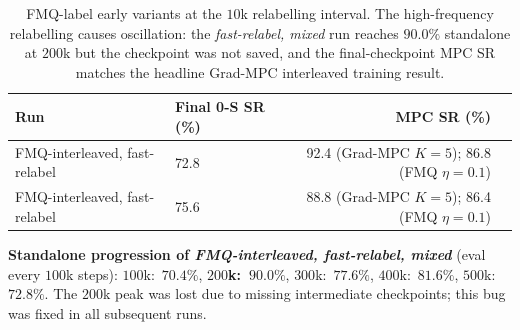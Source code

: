 \begin{table}[h]
\centering
\caption{FMQ-label early variants at the $10$k relabelling interval.
   The high-frequency relabelling causes oscillation: the
   \emph{fast-relabel, mixed} run reaches $90.0\%$ standalone at $200$k
   but the checkpoint was not saved, and the final-checkpoint MPC SR
   matches the headline Grad-MPC interleaved training result.}
\label{tab:app-fmq-early}
\begin{tabular}{l l r l}
\toprule
Run & Final 0-S SR (\%) & MPC SR (\%) \\
\midrule
FMQ-interleaved, fast-relabel  & 72.8 & 92.4 (Grad-MPC $K{=}5$); 86.8 (FMQ $\eta{=}0.1$) \\
FMQ-interleaved, fast-relabel  & 75.6 & 88.8 (Grad-MPC $K{=}5$); 86.4 (FMQ $\eta{=}0.1$) \\
\bottomrule
\end{tabular}

\medskip
\noindent\textbf{Standalone progression of \emph{FMQ-interleaved, fast-relabel, mixed}} (eval every $100$k steps):
$100$k:~$70.4\%$, \textbf{$200$k:~$90.0\%$}, $300$k:~$77.6\%$,
$400$k:~$81.6\%$, $500$k:~$72.8\%$. The $200$k peak was lost due to
missing intermediate checkpoints; this bug was fixed in all subsequent
runs.
\end{table}

